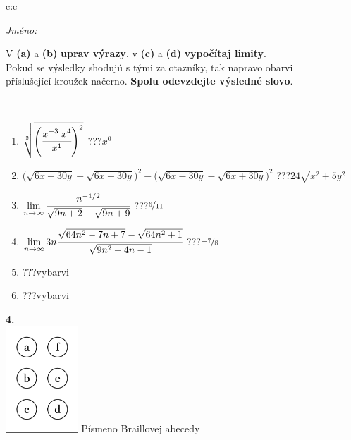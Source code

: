 \documentclass[10pt]{report}
\begin{document}
\begin{tabular}{c:c}
\begin{minipage}[c][104.5mm][t]{0.5\linewidth}
\begin{center}
\textit{Jméno:}\phantom{xxxxxxxxxxxxxxxxxxxxxxxxxxxxxxxxxxxxxxxxxxxxxxxxxxxxxxxxxxxxxxxxx}\\[5mm]
\begin{minipage}{0.95\linewidth}
\begin{center}
V \textbf{(a)} a \textbf{(b)} \textbf{uprav výrazy}, v \textbf{(c)} a \textbf{(d)} \textbf{vypočítaj limity}.\\Pokud se výsledky shodujú s tými za otazníky, tak napravo obarvi\\příslušející kroužek načerno. \textbf{Spolu odevzdejte výsledné slovo}.
\end{center}
\end{minipage}
\\[1mm]
\begin{minipage}{0.79\linewidth}
\begin{center}
\begin{varwidth}{\linewidth}
\begin{enumerate}
\small
\item $\sqrt[2]{\left(\cfrac{x^{-3}\;x^{4}}{x^{1}}\right)^{2}}$\quad \dotfill\; ???\;\dotfill \quad $x^{0}$
\item {\footnotesize{\scriptsize$\big(\sqrt{6x-30y}+\sqrt{6x+30y}\big)^2-\big(\sqrt{6x-30y}-\sqrt{6x+30y}\big)^2$}\quad \dotfill\; ???\;\dotfill \quad $24\sqrt{x^2+5y^2}$}
\item $\lim\limits_{n\to\infty}\cfrac{n^{-1/2}}{\sqrt{9n+2}-\sqrt{9n+9}}$\quad \dotfill\; ???\;\dotfill \quad $\nicefrac{6}{11}$
\item $\lim\limits_{n\to\infty}3n\cfrac{\sqrt{64n^2-7n+7}-\sqrt{64n^2+1}}{\sqrt{9n^2+4n-1}}$\quad \dotfill\; ???\;\dotfill \quad $\nicefrac{-7}{8}$
\item \quad \dotfill\; ???\;\dotfill \quad vybarvi
\item \quad \dotfill\; ???\;\dotfill \quad vybarvi
\end{enumerate}
\end{varwidth}
\end{center}
\end{minipage}
\begin{minipage}{0.20\linewidth}
\begin{center}
{\Huge\bfseries 4.} \\[2mm]
\includegraphics[height=40mm]{../images/braille.png}
{\small Písmeno Braillovej abecedy}
\end{center}
\end{minipage}
\end{center}
\end{minipage}
%
\end{tabular}
\end{document}
